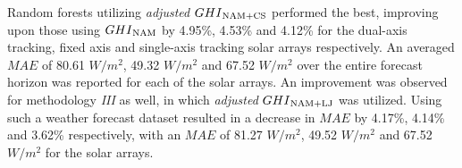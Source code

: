 \par Random forests utilizing \textit{adjusted} $GHI\textsubscript{NAM+CS}$ performed the best, improving upon those using $GHI\textsubscript{NAM}$ by 4.95\%, 4.53\% and 4.12\% for the dual-axis tracking, fixed axis and single-axis tracking solar arrays respectively. An averaged $MAE$ of 80.61 $W/m^2$, 49.32 $W/m^2$ and 67.52 $W/m^2$ over the entire forecast horizon was reported for each of the solar arrays. An improvement was observed for methodology \textit{III} as well, in which \textit{adjusted} $GHI\textsubscript{NAM+LJ}$ was utilized. Using such a weather forecast dataset resulted in a decrease in $MAE$ by 4.17\%, 4.14\% and 3.62\% respectively, with an $MAE$ of 81.27 $W/m^2$, 49.52 $W/m^2$ and 67.52 $W/m^2$ for the solar arrays.

\vspace{0.6em}

